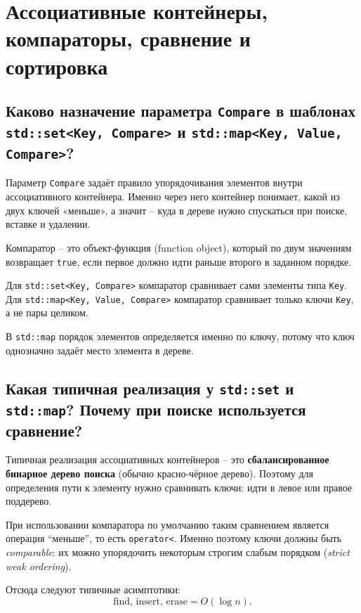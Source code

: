 \section{Ассоциативные контейнеры, компараторы, сравнение и сортировка}

\subsection{Каково назначение параметра \texttt{Compare} в шаблонах \texttt{std::set<Key, Compare>} и \texttt{std::map<Key, Value, Compare>}?}
Параметр \texttt{Compare} задаёт правило упорядочивания элементов внутри ассоциативного контейнера. Именно через него контейнер понимает, какой из двух ключей «меньше», а значит -- куда в дереве нужно спускаться при поиске, вставке и удалении.

\begin{definition}[Компаратор]
Компаратор -- это объект-функция (function object), который по двум значениям возвращает \texttt{true}, если первое должно идти раньше второго в заданном порядке.
\end{definition}

Для \texttt{std::set<Key, Compare>} компаратор сравнивает сами элементы типа \texttt{Key}.  
Для \texttt{std::map<Key, Value, Compare>} компаратор сравнивает только ключи \texttt{Key}, а не пары целиком.

\begin{remark}
В \texttt{std::map} порядок элементов определяется именно по ключу, потому что ключ однозначно задаёт место элемента в дереве.
\end{remark}

\subsection{Какая типичная реализация у \texttt{std::set} и \texttt{std::map}? Почему при поиске используется сравнение?}
Типичная реализация ассоциативных контейнеров -- это \textbf{сбалансированное бинарное дерево поиска} (обычно красно-чёрное дерево). Поэтому для определения пути к элементу нужно сравнивать ключи: идти в левое или правое поддерево.

При использовании компаратора по умолчанию таким сравнением является операция ``меньше'', то есть \texttt{operator<}. Именно поэтому ключи должны быть \textit{comparable}: их можно упорядочить некоторым строгим слабым порядком (\textit{strict weak ordering}).

Отсюда следуют типичные асимптотики:
\[
\text{find, insert, erase} = O(\log n).
\]

